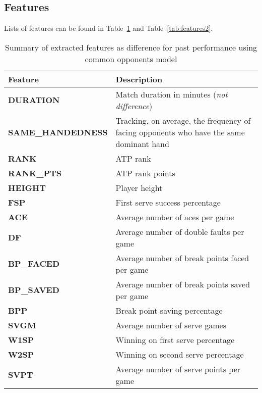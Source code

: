 \documentclass[paper=a4, fontsize=11pt]{scrartcl} %
\numberwithin{equation}{section} %
\numberwithin{figure}{section} %
\numberwithin{table}{section} %
\begin{document}
\subsection{Features}
\label{sec:feat}
Lists of features can be found in Table~\ref{tab:features} and Table~\ref{tab:features2}. 

\begin{center}
\begin{table}[h]
    \begin{tabular}{  l | p{4cm} }
    \hline
    Feature  & Description \\ \hline
    \textbf{DURATION}  & Match duration in minutes (\textit{not difference}) \\ \hline
    \textbf{SAME\_HANDEDNESS}  & Tracking, on average, the frequency of facing opponents who have the same dominant hand \\ \hline
    \textbf{RANK}  & ATP rank \\ \hline
    \textbf{RANK\_PTS}  & ATP rank points \\ \hline
    \textbf{HEIGHT}  & Player height \\ \hline
    \textbf{FSP}  & First serve success percentage \\ \hline
    \textbf{ACE}  & Average number of aces per game \\ \hline
    \textbf{DF}  & Average number of double faults per game \\ \hline
    \textbf{BP\_FACED}  & Average number of break points faced per game \\ \hline
    \textbf{BP\_SAVED}  & Average number of break points saved per game \\ \hline
    \textbf{BPP}  & Break point saving percentage \\ \hline
    \textbf{SVGM}  & Average number of serve games \\ \hline
    \textbf{W1SP}  & Winning on first serve percentage \\ \hline
    \textbf{W2SP}  & Winning on second serve percentage \\ \hline
    \textbf{SVPT}  & Average number of serve points per game \\ \hline
    \end{tabular}
    \caption{Summary of extracted features as difference for past performance using common opponents model}
    \label{tab:features}
    \end{table}
\end{center}
\end{document}
